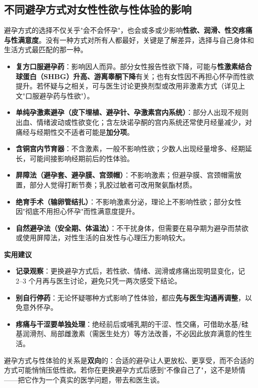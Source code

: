 \subsection{不同避孕方式对女性性欲与性体验的影响}

避孕方式的选择不仅关乎"会不会怀孕"，也会或多或少影响\textbf{性欲、润滑、性交疼痛与性满意度}。没有一种方式对所有人都最好，关键是了解差异，选择与自己身体和生活方式最匹配的那一种。

\begin{itemize}
	\item \textbf{复方口服避孕药}：影响因人而异。部分女性报告性欲下降，可能与\textbf{性激素结合球蛋白（SHBG）升高、游离睾酮下降}有关；也有女性因不再担心怀孕而性欲提升。若怀疑与之相关，可与医生讨论更换剂型或改用非激素方式（详见上文"口服避孕药与性欲"）。
	\item \textbf{单纯孕激素避孕（皮下埋植、避孕针、孕激素宫内系统）}：部分人出现不规则出血、情绪波动或性欲变化；含左炔诺孕酮的宫内系统还常使月经量减少，对痛经与经期性交不适者可能是\textbf{加分项}。
	\item \textbf{含铜宫内节育器}：不含激素，一般不影响性欲；少数人出现经量增多、经期延长，可能间接影响经期前后的性体验。
	\item \textbf{屏障法（避孕套、避孕膜、宫颈帽）}：不影响激素；但避孕膜、宫颈帽需放置，部分人觉得打断节奏；乳胶过敏者可改用聚氨酯材质。
	\item \textbf{绝育手术（输卵管结扎）}：不影响激素分泌，理论上不影响性欲；部分女性因"彻底不用担心怀孕"而性满意度提升。
	\item \textbf{自然避孕法（安全期、体温法）}：不干扰身体，但需要在易孕期为避孕而禁欲或使用屏障法，对性生活的自发性与心理压力影响较大。
\end{itemize}

\noindent\textbf{实用建议}

\begin{itemize}
	\item \textbf{记录观察}：更换避孕方式后，若性欲、情绪、润滑或疼痛出现明显变化，记 2--3 个月再与医生讨论，避免只凭一两次感受下结论。
	\item \textbf{别自行停药}：无论怀疑哪种方式影响了性体验，都应\textbf{先与医生沟通再调整}，以免意外怀孕。
	\item \textbf{疼痛与干涩要单独处理}：绝经前后或哺乳期的干涩、性交痛，可借助水基/硅基润滑剂、局部雌激素（需医生处方）等方法改善，不必因此放弃满意的性生活。
\end{itemize}

\begin{tcolorbox}[colback=pink!5!white,colframe=red!50!black,title=贴心小叮咛]
避孕方式与性体验的关系是\textbf{双向}的：合适的避孕让人更放松、更享受，而不合适的方式可能悄悄压低性欲。若你在更换避孕方式后感到"不像自己了"，这不是矫情——把它作为一个真实的医学问题，带去和医生谈。
\end{tcolorbox}
